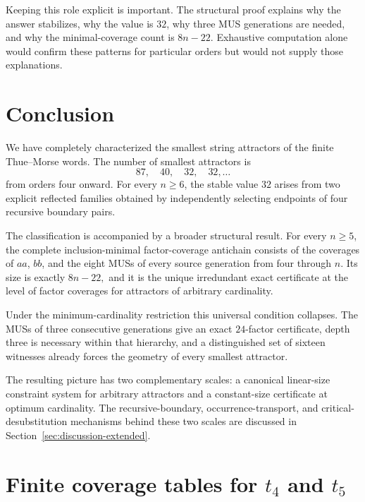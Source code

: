 \documentclass[10pt,a4paper]{article}
\theoremstyle{definition}\newtheorem{definition}[theorem]{Definition}
\theoremstyle{remark}\newtheorem{remark}[theorem]{Remark}
\begin{document}
Keeping this role explicit is important.  The structural proof explains why the answer stabilizes, why the value is $32$, why three MUS generations are needed, and why the minimal-coverage count is $8n-22$.  Exhaustive computation alone would confirm these patterns for particular orders but would not supply those explanations.


\section{Conclusion}
\label{sec:conclusion-extended}

We have completely characterized the smallest string attractors of the finite Thue--Morse words.  The number of smallest attractors is
\[
 87,\quad40,\quad32,\quad32,\ldots
\]
from orders four onward.  For every $n\ge6$, the stable value $32$ arises from two explicit reflected families obtained by independently selecting endpoints of four recursive boundary pairs.

The classification is accompanied by a broader structural result.  For every $n\ge5$, the complete inclusion-minimal factor-coverage antichain consists of the coverages of $aa$, $bb$, and the eight MUSs of every source generation from four through $n$.  Its size is exactly
$
 8n-22,
$
and it is the unique irredundant exact certificate at the level of factor coverages for attractors of arbitrary cardinality.

Under the minimum-cardinality restriction this universal condition collapses.  The MUSs of three consecutive generations give an exact $24$-factor certificate, depth three is necessary within that hierarchy, and a distinguished set of sixteen witnesses already forces the geometry of every smallest attractor.

The resulting picture has two complementary scales: a canonical linear-size constraint system for arbitrary attractors and a constant-size certificate at optimum cardinality.  The recursive-boundary, occurrence-transport, and critical-desubstitution mechanisms behind these two scales are discussed in Section~\ref{sec:discussion-extended}.




\clearpage 

\appendix
\section{Finite coverage tables for \texorpdfstring{$t_4$ and $t_5$}{t4 and t5}}
\label{app:finite-tables}
\end{document}
